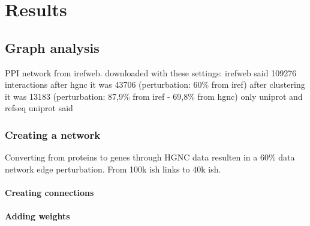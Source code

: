 \part{Results}
\label{pa:results}
\chapter{Graph analysis}
PPI network from irefweb.
downloaded with these settings: %
irefweb said 109276 interactions 
after hgnc it was 43706 (perturbation: 60\% from iref)
after clustering it was 13183 (perturbation: 87,9\% from iref - 69,8\% from hgnc) %
only uniprot and refseq
uniprot said
\section{Creating a network}
Converting from proteins to genes through HGNC data resulten in a 60\% data
network edge perturbation. From 100k ish links to 40k ish.
\subsection{Creating connections}
\subsection{Adding weights}
